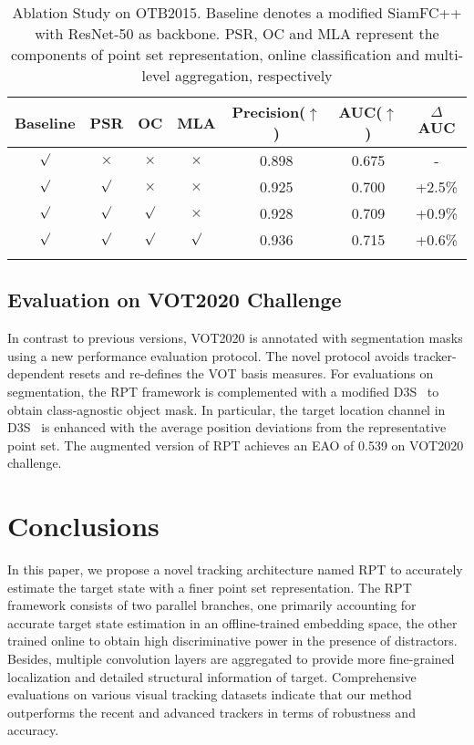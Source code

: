 \documentclass[runningheads]{llncs}
\begin{document}
\begin{table}
\begin{center}
\caption{Ablation Study on OTB2015. Baseline denotes a modified SiamFC++ with ResNet-50 as backbone. PSR, OC and MLA represent the components of point set representation, online classification and multi-level aggregation, respectively}
\label{table:ablation}
\begin{tabular}{@{}cccc|ccc@{}}
\hline
Baseline & PSR & OC & MLA & Precision($\uparrow$) & AUC($\uparrow$) & $\Delta$AUC\tabularnewline
\hline
$\surd$  & $\times$ & $\times$ & $\times$ & 0.898 & 0.675 & - \tabularnewline
$\surd$  & $\surd$  & $\times$ & $\times$ & 0.925 & 0.700 & +2.5\% \tabularnewline
$\surd$  & $\surd$  & $\surd$  & $\times$ & 0.928 & 0.709 & +0.9\% \tabularnewline
$\surd$  & $\surd$  & $\surd$  & $\surd$  & 0.936 & 0.715 & +0.6\% \tabularnewline
\hline\noalign{\smallskip}
\end{tabular}
\end{center}
\end{table}


\subsection{Evaluation on VOT2020 Challenge}\label{header-n52}

In contrast to previous versions, VOT2020 is annotated with segmentation
masks using a new performance evaluation protocol. The novel protocol
avoids tracker-dependent resets and re-defines the VOT basis measures.
For evaluations on segmentation, the RPT framework is complemented with
a modified D3S~\cite{D3S} to obtain class-agnostic object mask. In particular, the
target location channel in D3S~\cite{D3S} is enhanced with the average position
deviations from the representative point set. The augmented version of
RPT achieves an EAO of 0.539 on VOT2020 challenge.






\section{Conclusions}
In this paper, we propose a novel tracking architecture named RPT to accurately estimate the target state with a finer point set representation. The RPT framework consists of two parallel branches, one primarily accounting for accurate target state estimation in an offline-trained embedding space, the other trained online to obtain high discriminative power in the presence of distractors. Besides, multiple convolution layers are aggregated to provide more fine-grained localization and detailed structural information of target. Comprehensive evaluations on various visual tracking datasets indicate that our method outperforms the recent and advanced trackers in terms of robustness and accuracy.







\clearpage


\end{document}
